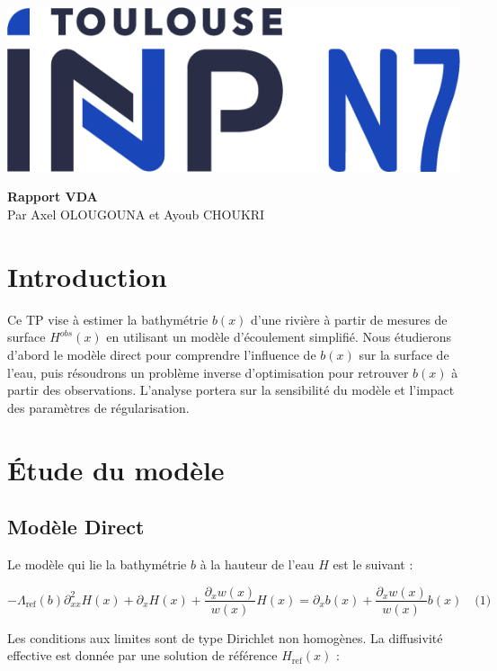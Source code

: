 \documentclass{article}
\begin{document}
\begin{titlepage}
\begin{center}
    \includegraphics[width=0.3\linewidth]{Logo-toulouse-inp-N7.png}
\end{center}
    \centering
    \vspace*{3in} %
    \Huge \textbf{Rapport VDA} \\[1cm] %
    \Large {Par Axel OLOUGOUNA et Ayoub CHOUKRI} \\ %
    \Large \date{March 2025} %
    \vfill
\end{titlepage}

\newpage

\tableofcontents

\newpage


\section{Introduction} 

Ce TP vise à estimer la bathymétrie \( b(x) \) d'une rivière à partir de mesures de surface \( H^{obs}(x) \) en utilisant un modèle d'écoulement simplifié. Nous étudierons d'abord le modèle direct pour comprendre l’influence de \( b(x) \) sur la surface de l’eau, puis résoudrons un problème inverse d’optimisation pour retrouver \( b(x) \) à partir des observations. L’analyse portera sur la sensibilité du modèle et l’impact des paramètres de régularisation.

\section{Étude du modèle}

\subsection{Modèle Direct}
Le modèle qui lie la bathymétrie \( b \) à la hauteur de l'eau \( H \) est le suivant :

\[
-\Lambda_{\text{ref}}(b)\partial^{2}_{xx}H(x) + \partial_{x}H(x) + \frac{\partial_{x}w(x)}{w(x)}H(x) = \partial_{x}b(x) + \frac{\partial_{x}w(x)}{w(x)}b(x)
\quad \text{(1)}
\]

Les conditions aux limites sont de type Dirichlet non homogènes. La diffusivité effective est donnée par une solution de référence \( H_{\text{ref}}(x) \) :
\end{document}
